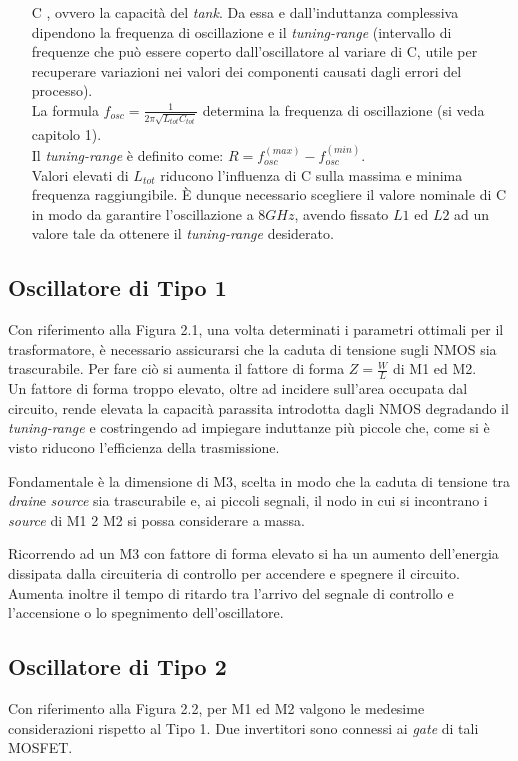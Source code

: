 \documentclass[a4paper, 12pt]{memoir}
\begin{document}
\begin{enumerate}
\item[C], ovvero la capacità del \emph{tank}. Da essa e dall'induttanza
	complessiva dipendono la frequenza di oscillazione e il
	\emph{tuning-range} (intervallo di frequenze che può essere coperto
	dall'oscillatore al variare di C, utile per recuperare variazioni nei
	valori dei componenti causati dagli errori del processo).\\
	La formula $ f_{osc}=\frac{1}{2\pi\sqrt{L_{tot}C_{tot}}}$ determina la
	frequenza di oscillazione (si veda capitolo 1).
	\\Il \emph{tuning-range} è definito come: $ R = f_{osc}^{(max)} -
	f_{osc}^{(min)} $.\\
	Valori elevati di $L_{tot}$ riducono l'influenza di C sulla massima e
	minima frequenza raggiungibile. \`E dunque necessario scegliere il valore
	nominale di C in modo da garantire l'oscillazione a $8GHz$, avendo
	fissato $L1$ ed $L2$ ad un valore tale da ottenere il \emph{tuning-range}
	desiderato.
\end{enumerate}

\subsection{Oscillatore di Tipo 1}
Con riferimento alla Figura 2.1, una volta determinati i parametri ottimali per
il trasformatore, è necessario assicurarsi che la caduta di tensione sugli NMOS
sia trascurabile. Per fare ciò si aumenta il fattore di forma $Z = \frac{W}{L}$
di M1 ed M2.\\
Un fattore di forma troppo elevato, oltre ad incidere sull'area occupata dal 
circuito, rende elevata la capacità parassita introdotta dagli NMOS degradando
il \emph{tuning-range} e costringendo ad impiegare induttanze più piccole che,
come si è visto riducono l'efficienza della trasmissione.

Fondamentale è la dimensione di M3, scelta in modo che la caduta di tensione
tra \emph{drain}e \emph{source} sia trascurabile e, ai piccoli segnali, il nodo
in cui si incontrano i \emph{source} di M1 2 M2 si possa considerare a massa.

Ricorrendo ad un M3 con fattore di forma elevato si ha un aumento dell'energia
dissipata dalla circuiteria di controllo per accendere e spegnere il circuito.
Aumenta inoltre il tempo di ritardo tra l'arrivo del segnale di controllo e 
l'accensione o lo spegnimento dell'oscillatore.

\subsection{Oscillatore di Tipo 2}
Con riferimento alla Figura 2.2, per M1 ed M2 valgono le medesime
considerazioni rispetto al Tipo 1.
Due invertitori sono connessi ai \emph{gate} di tali MOSFET.
\end{document}
